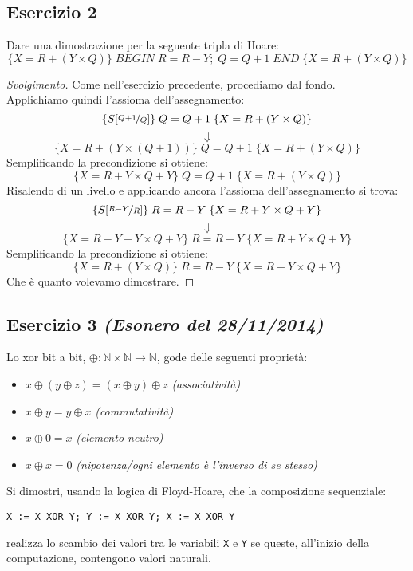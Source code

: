 \subsection{Esercizio 2}
Dare una dimostrazione per la seguente tripla di Hoare:
$$ \{X=R+(Y \times Q) \} \; BEGIN \; R=R-Y; \; Q=Q+1 \; END \; \{X=R+(Y \times Q)\} $$

\begin{proof}[Svolgimento]
Come nell'esercizio precedente, procediamo dal fondo.\\
Applichiamo quindi l'assioma dell'assegnamento:
$$ \{S[\nicefrac{Q+1}{Q}] \} \; Q=Q+1 \; \{X=R+(Y \times Q)\} $$
$$ \Downarrow $$
$$ \{X=R+(Y \times (Q+1)) \} \; Q=Q+1 \; \{X=R+(Y \times Q)\} $$
Semplificando la precondizione si ottiene:
$$ \{X=R+Y \times Q + Y \} \; Q=Q+1 \; \{X=R+(Y \times Q)\} $$
Risalendo di un livello e applicando ancora l'assioma dell'assegnamento si trova:
$$ \{S[\nicefrac{R-Y}{R}] \} \; R=R-Y \; \{X=R+Y \times Q + Y \} $$
$$ \Downarrow $$
$$ \{X= R-Y+Y \times Q+Y \} \; R=R-Y \; \{X=R+Y \times Q + Y \} $$
Semplificando la precondizione si ottiene:
$$ \{X= R+(Y \times Q) \} \; R=R-Y \; \{X=R+Y \times Q + Y \} $$
Che è quanto volevamo dimostrare.
\end{proof}

\subsection{Esercizio 3 \emph{(Esonero del 28/11/2014)}}
Lo xor bit a bit, $ \oplus: \mathbb{N} \times \mathbb{N} \rightarrow \mathbb{N} $, gode delle
seguenti proprietà:
\begin{itemize}
	\item $ x \oplus (y \oplus z) = (x \oplus y) \oplus z $ \emph{(associatività)}
	\item $ x \oplus y = y \oplus x $ \emph{(commutatività)}
	\item $ x \oplus 0 = x $ \emph{(elemento neutro)}
	\item $ x \oplus x = 0 $ \emph{(nipotenza/ogni elemento è l'inverso di se stesso)}
\end{itemize}
Si dimostri, usando la logica di Floyd-Hoare, che la composizione sequenziale:
\begin{center}
\texttt{X := X XOR Y; Y := X XOR Y; X := X XOR Y}
\end{center}
realizza lo scambio dei valori tra le variabili \texttt{X} e \texttt{Y} se queste, all'inizio della computazione, contengono valori naturali.

